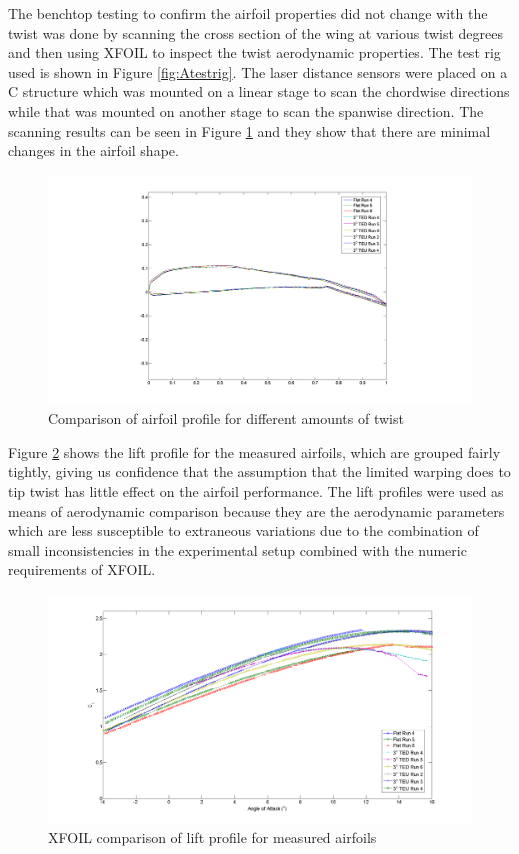 \documentclass[11pt]{ucthesis}
\begin{document}
The benchtop testing to confirm the airfoil properties did not change with the twist was done by scanning the cross section of the wing at various twist degrees and then using XFOIL to inspect the twist aerodynamic properties. The test rig used is shown in Figure \ref{fig:Atestrig}. The laser distance sensors were placed on a C structure which was mounted on a linear stage to scan the chordwise directions while that was mounted on another stage to scan the spanwise direction. The scanning results can be seen in Figure \ref{fig:Ascan} and they show that there are minimal changes in the airfoil shape.

\begin{figure}[thpb]
\centering
\includegraphics[width=0.75\linewidth]{Figures/AirfoilDirectMeasurements.png}
\caption{Comparison of airfoil profile for different amounts of twist}
\label{fig:Ascan}
\end{figure}

Figure \ref{fig:Alift} shows the lift profile for the measured airfoils, which are grouped fairly tightly, giving us confidence that the assumption that the limited warping does to tip twist has little effect on the airfoil performance. The lift profiles were used as means of aerodynamic comparison because they are the aerodynamic parameters which are less susceptible to extraneous variations due to the combination of small inconsistencies in the experimental setup combined with the numeric requirements of XFOIL. \cite{drela1989xfoil}

\begin{figure}[thpb]
\centering
\includegraphics[width=0.75\linewidth]{Figures/CLDirectMeasurements.png}
\caption{XFOIL comparison of lift profile for measured airfoils}
\label{fig:Alift}
\end{figure}
\end{document}
